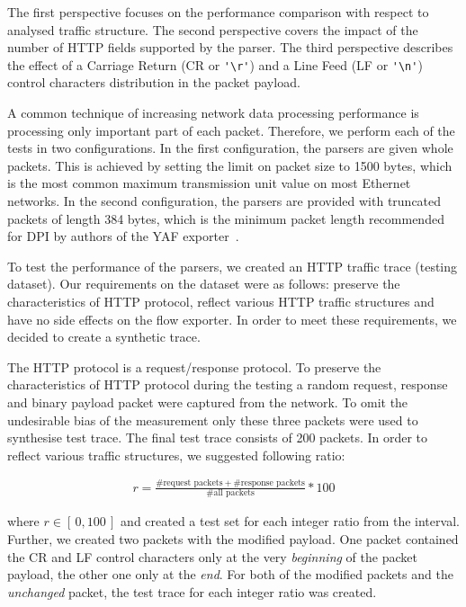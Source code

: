 The first perspective focuses on the performance comparison with respect to analysed traffic structure. The second perspective covers the impact of the number of HTTP fields supported by the parser. The third perspective describes the effect of a Carriage Return (CR or \verb!'\r'!) and a Line Feed  (LF or \verb!'\n'!) control characters distribution in the packet payload.

A common technique of increasing network data processing performance is processing only important part of each packet. Therefore, we perform each of the tests in two configurations. In the first configuration, the parsers are given whole packets. This is achieved by setting the limit on packet size to 1500 bytes, which is the most common maximum transmission unit value on most Ethernet networks. In the second configuration, the parsers are provided with truncated packets of length 384 bytes, which is the minimum packet length recommended for DPI by authors of the YAF exporter~\cite{Inacio-2010-YAF}.

To test the performance of the parsers, we created an HTTP traffic trace (testing dataset). Our requirements on the dataset were as follows: preserve the characteristics of HTTP protocol, reflect various HTTP traffic structures and have no side effects on the flow exporter. In order to meet these requirements, we decided to create a synthetic trace.

The HTTP protocol is a request/response protocol. To preserve the characteristics of HTTP protocol during the testing a random request, response and binary payload packet were captured from the network. To omit the undesirable bias of the measurement only these three packets were used to synthesise test trace. The final test trace consists of 200 packets. In order to reflect various traffic structures, we suggested following ratio:

\begin{align}
       r = \frac{\# \text{request packets}+\#\text{response packets}}{\#\text{all packets}}*100
\end{align}

where $r \in [\,0,100\,]$ and created a test set for each integer ratio from the interval. Further, we created two packets with the modified payload. One packet contained the CR and LF control characters only at the very \emph{beginning} of the packet payload, the other one only at the \emph{end}. For both of the modified packets and the \emph{unchanged} packet, the test trace for each integer ratio was created.

